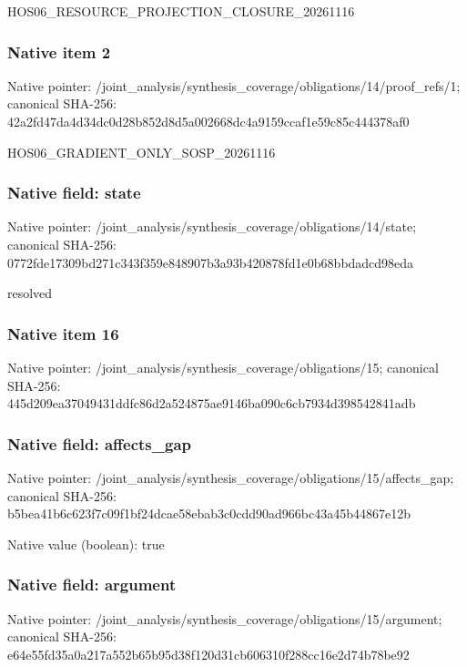 \documentclass[10pt,a4paper]{article}
\begin{document}
\begingroup\raggedright\sloppy HOS06\_\allowbreak{}RESOURCE\_\allowbreak{}PROJECTION\_\allowbreak{}CLOSURE\_\allowbreak{}20261116\par\endgroup

\subsubsection{Native item 2}
Native pointer: /joint\_\allowbreak{}analysis/synthesis\_\allowbreak{}coverage/obligations/14/proof\_\allowbreak{}refs/1; canonical SHA-256: 42a2fd47da4d34dc0d28b852d8d5a002668dc4a9159ccaf1e59c85c444378af0

\begingroup\raggedright\sloppy HOS06\_\allowbreak{}GRADIENT\_\allowbreak{}ONLY\_\allowbreak{}SOSP\_\allowbreak{}20261116\par\endgroup

\subsubsection{Native field: state}
Native pointer: /joint\_\allowbreak{}analysis/synthesis\_\allowbreak{}coverage/obligations/14/state; canonical SHA-256: 0772fde17309bd271c343f359e848907b3a93b420878fd1e0b68bbdadcd98eda

\begingroup\raggedright\sloppy resolved\par\endgroup

\subsubsection{Native item 16}
Native pointer: /joint\_\allowbreak{}analysis/synthesis\_\allowbreak{}coverage/obligations/15; canonical SHA-256: 445d209ea37049431ddfc86d2a524875ae9146ba090c6cb7934d398542841adb

\subsubsection{Native field: affects\_\allowbreak{}gap}
Native pointer: /joint\_\allowbreak{}analysis/synthesis\_\allowbreak{}coverage/obligations/15/affects\_\allowbreak{}gap; canonical SHA-256: b5bea41b6c623f7c09f1bf24dcae58ebab3c0cdd90ad966bc43a45b44867e12b

Native value (boolean): true

\subsubsection{Native field: argument}
Native pointer: /joint\_\allowbreak{}analysis/synthesis\_\allowbreak{}coverage/obligations/15/argument; canonical SHA-256: e64e55fd35a0a217a552b65b95d38f120d31cb606310f288cc16e2d74b78be92
\end{document}

